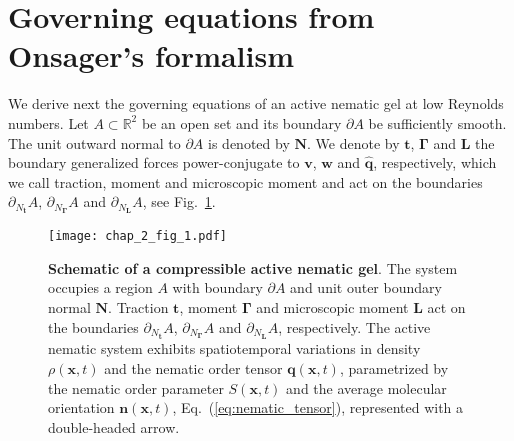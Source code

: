 \section{Governing equations from Onsager's formalism} \label{sec:Onsager}


We derive next the governing equations of an active nematic gel at low Reynolds numbers. Let $A \subset \mathbb{R}^2$ be an open set and its boundary $\partial A$ be sufficiently smooth. The unit outward normal to $\partial A$ is denoted by $\bm{N}$.  We denote by  $\bm{t}$, $\bm{\Gamma}$ and $\bm{L}$ the boundary generalized forces power-conjugate to $\bm{v}$,  $\bm{w}$ and  $\widehat{\bm{q}}$, respectively, which we call traction, moment and microscopic moment and act on the boundaries $\partial_{N_{\bm{t}}} A $, $\partial_{N_{\bm{\Gamma}}} A $ and $\partial_{N_{\bm{L}}} A $, see Fig.~\ref{fig0}.

\begin{figure}[H]
	\centering
	\texttt{[image: chap\_2\_fig\_1.pdf]}
	\caption{\label{fig0}  \textbf{Schematic of a compressible active nematic gel}. The system occupies  a region $A$ with boundary $\partial A$ and unit outer boundary normal $\bm{N}$. Traction $\bm{t}$, moment $\bm{\Gamma}$ and microscopic moment $\bm{L}$ act on the  boundaries $\partial_{N_{\bm{t}}} A $, $\partial_{N_{\bm{\Gamma}}} A $ and $\partial_{N_{\bm{L}}} A $, respectively. The active nematic system exhibits spatiotemporal variations in density $\rho(\bm{x},t)$ and the nematic order tensor $\bm{q}(\bm{x},t)$, parametrized by the nematic order parameter $S(\bm{x},t)$ and the average molecular orientation $\bm{n}(\bm{x},t)$, Eq.~(\ref{eq:nematic_tensor}), represented with a double-headed arrow.
	}
\end{figure}

